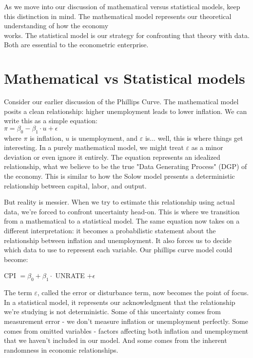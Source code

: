 \documentclass[10pt]{article}
\begin{document}
As we move into our discussion of mathematical versus statistical models, keep this distinction in mind. The mathematical model represents our theoretical understanding of how the economy\\
works. The statistical model is our strategy for confronting that theory with data. Both are essential to the econometric enterprise.

\section*{Mathematical vs Statistical models}
Consider our earlier discussion of the Phillips Curve. The mathematical model posits a clean relationship: higher unemployment leads to lower inflation. We can write this as a simple equation:\\
$\pi=\beta_{0}-\beta_{1} \cdot u+\epsilon$\\
where $\pi$ is inflation, $u$ is unemployment, and $\varepsilon$ is... well, this is where things get interesting. In a purely mathematical model, we might treat $\varepsilon$ as a minor deviation or even ignore it entirely. The equation represents an idealized relationship, what we believe to be the true "Data Generating Process" (DGP) of the economy. This is similar to how the Solow model presents a deterministic relationship between capital, labor, and output.

But reality is messier. When we try to estimate this relationship using actual data, we're forced to confront uncertainty head-on. This is where we transition from a mathematical to a statistical model. The same equation now takes on a different interpretation: it becomes a probabilistic statement about the relationship between inflation and unemployment. It also forces us to decide which data to use to represent each variable. Our phillips curve model could become:

CPI $=\beta_{0}+\beta_{1} \cdot$ UNRATE $+\epsilon$

The term $\varepsilon$, called the error or disturbance term, now becomes the point of focus. In a statistical model, it represents our acknowledgment that the relationship we're studying is not deterministic. Some of this uncertainty comes from measurement error - we don't measure inflation or unemployment perfectly. Some comes from omitted variables - factors affecting both inflation and unemployment that we haven't included in our model. And some comes from the inherent randomness in economic relationships.
\end{document}

